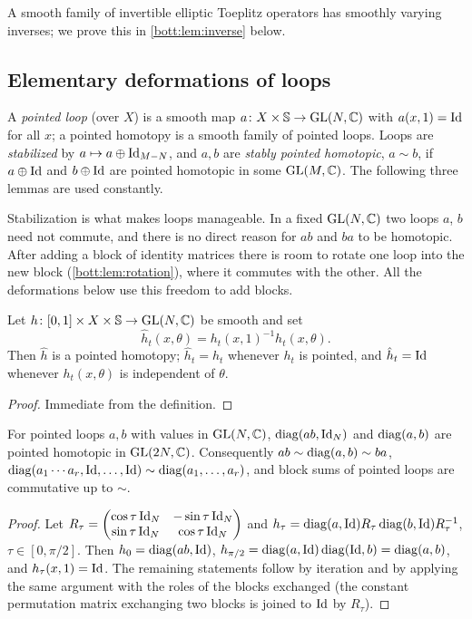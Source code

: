 A smooth family of invertible elliptic Toeplitz operators has smoothly varying
inverses; we prove this in \cref{bott:lem:inverse} below.

\subsection{Elementary deformations of loops}

A \emph{pointed loop} (over $X$) is a smooth map
$a\colon X\times\mathbb{S}\to\operatorname{GL}(N,\mathbb{C})$ with $a(x,1)=\operatorname{Id}$ for all $x$; a pointed
homotopy is a smooth family of pointed loops. Loops are \emph{stabilized} by
$a\mapsto a\oplus\operatorname{Id}_{M-N}$, and $a,b$ are \emph{stably pointed homotopic},
$a\sim b$, if $a\oplus\operatorname{Id}$ and $b\oplus\operatorname{Id}$ are pointed homotopic in some
$\operatorname{GL}(M,\mathbb{C})$. The following three lemmas are used constantly.

\begin{discussion}
  Stabilization is what makes loops manageable. In a fixed $\operatorname{GL}(N,\mathbb{C})$ two loops
  $a$, $b$ need not commute, and there is no direct reason for $ab$ and $ba$
  to be homotopic. After adding a block of identity matrices there is room to rotate
  one loop into the new block (\cref{bott:lem:rotation}), where it commutes with
  the other. All the deformations below use this freedom to add blocks.
\end{discussion}

\begin{lemma}\label{bott:lem:normalize}
  Let $h\colon[0,1]\times X\times\mathbb{S}\to\operatorname{GL}(N,\mathbb{C})$ be smooth and set
  \begin{equation*}
    \hat h_t(x,\theta)=h_t(x,1)^{-1}h_t(x,\theta).
  \end{equation*}
  Then $\hat h$ is a pointed homotopy; $\hat h_t=h_t$ whenever $h_t$ is pointed, and $\hat h_t=\operatorname{Id}$ whenever
  $h_t(x,\theta)$ is independent of $\theta$.
\end{lemma}
\begin{proof}
  Immediate from the definition.
\end{proof}

\begin{lemma}[Rotation]\label{bott:lem:rotation}
  For pointed loops $a,b$ with values in $\operatorname{GL}(N,\mathbb{C})$, $\operatorname{diag}(ab,\operatorname{Id}_N)$ and
  $\operatorname{diag}(a,b)$ are pointed homotopic in $\operatorname{GL}(2N,\mathbb{C})$. Consequently
  $ab\sim\operatorname{diag}(a,b)\sim ba$, $\operatorname{diag}(a_1\cdots a_r,\operatorname{Id},\dots,\operatorname{Id})\sim
  \operatorname{diag}(a_1,\dots,a_r)$, and block sums of pointed loops are commutative up to
  $\sim$.
\end{lemma}
\begin{proof}
  Let $R_\tau=\begin{pmatrix}\cos\tau\operatorname{Id}_N&-\sin\tau\operatorname{Id}_N\\\sin\tau\operatorname{Id}_N&\cos\tau\operatorname{Id}_N\end{pmatrix}$
  and $h_\tau=\operatorname{diag}(a,\operatorname{Id})R_\tau\operatorname{diag}(b,\operatorname{Id})R_\tau^{-1}$, $\tau\in[0,\pi/2]$. Then
  $h_0=\operatorname{diag}(ab,\operatorname{Id})$, $h_{\pi/2}=\operatorname{diag}(a,\operatorname{Id})\operatorname{diag}(\operatorname{Id},b)=\operatorname{diag}(a,b)$, and
  $h_\tau(x,1)=\operatorname{Id}$. The remaining statements follow by iteration and by applying
  the same argument with the roles of the blocks exchanged (the constant
  permutation matrix exchanging two blocks is joined to $\operatorname{Id}$ by $R_\tau$).
\end{proof}

